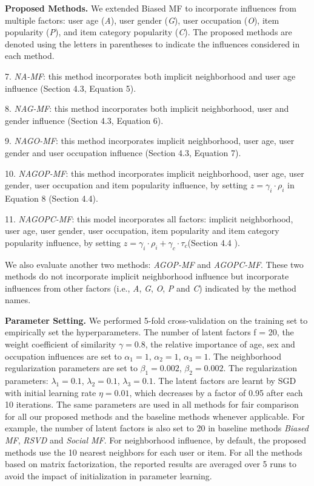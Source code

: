 \documentclass{llncs}
\begin{document}
	\noindent\textbf{Proposed Methods.} We extended Biased MF to incorporate influences from multiple factors: user age (\emph{A}),
	user gender (\emph{G}), user occupation (\emph{O}), item popularity (\emph{P}), and item category popularity (\emph{C}).
	The proposed methods are denoted using the letters in parentheses to indicate the influences considered
	in each method.
	
	7. \emph{NA-MF}: this method incorporates both implicit neighborhood and user age
	influence (Section 4.3, Equation 5).
	
	8. \emph{NAG-MF}: this method incorporates both implicit neighborhood, user and gender
	influence (Section 4.3, Equation 6).
	
	9. \emph{NAGO-MF}: this method incorporates implicit  neighborhood, user age, user gender and
	user occupation influence (Section 4.3, Equation 7).
	
	10. \emph{NAGOP-MF}: this method incorporates implicit  neighborhood, user age, user gender,
	user occupation and item popularity influence, by setting $z =\gamma_i\cdot\rho_i$ in Equation 8 (Section 4.4).
	
	11. \emph{NAGOPC-MF}: this model incorporates all factors: implicit neighborhood, user age, user gender,
	user occupation, item popularity and item category popularity influence, by setting $z =\gamma_i\cdot\rho_i+\gamma_c\cdot \tau_c$(Section 4.4 ).
	
	We also evaluate another two methods: \emph{AGOP-MF} and \emph{AGOPC-MF}.
	These two methods do not incorporate implicit neighborhood
	influence but incorporate influences from other factors (i.e., \emph{A}, \emph{G},
	\emph{O}, \emph{P} and \emph{C}) indicated by the method names.
	
	\noindent\textbf{Parameter Setting.} We performed 5-fold cross-validation on the
	training set to empirically set the hyperparameters. The number of latent factors f = 20, the weight coefficient of similarity $\gamma=0.8$,
	the relative importance of age, sex and occupation influences are set to $\alpha_{1}=1$, $\alpha_{2}=1$, $\alpha_{3}=1$.
	The neighborhood regularization parameters are set to $\beta_{1}=0.002$, $\beta_{2}=0.002$.
	The regularization parameters: $\lambda_{1}=0.1$, $\lambda_{2}=0.1$, $\lambda_{3}=0.1$.
	The latent factors are learnt by SGD with initial learning rate $\eta= 0.01$,
	which decreases by a factor of 0.95 after each 10 iterations.
	The same parameters are used in all methods for fair comparison for all our proposed methods and the baseline methods
	whenever applicable. For example, the number of latent factors is
	also set to 20 in baseline methods \emph{Biased MF}, \emph{RSVD} and \emph{Social
		MF}. For neighborhood influence, by default, the proposed methods use the 10 nearest neighbors for each user or item. For
	all the methods based on matrix factorization, the reported results
	are averaged over 5 runs to avoid the impact of initialization in parameter learning.
\end{document}
